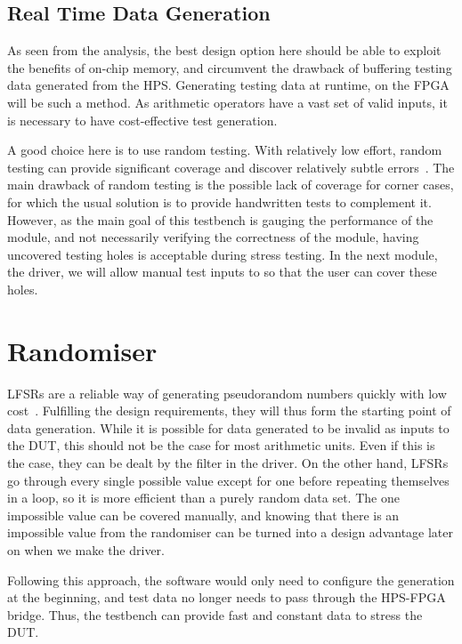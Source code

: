 \subsection{Real Time Data Generation}
As seen from the analysis, the best design option here should be able to exploit the benefits of on-chip memory, and circumvent the drawback of buffering testing data generated from the HPS.
Generating testing data at runtime, on the FPGA will be such a method.
As arithmetic operators have a vast set of valid inputs, it is necessary to have cost-effective test generation.

A good choice here is to use random testing.
With relatively low effort, random testing can provide significant coverage and discover relatively subtle errors~\cite{Duran1}.
The main drawback of random testing is the possible lack of coverage for corner cases, for which the usual solution is to provide handwritten tests to complement it.
However, as the main goal of this testbench is gauging the performance of the module, and not necessarily verifying the correctness of the module, having uncovered testing holes is acceptable during stress testing.
In the next module, the driver, we will allow manual test inputs to so that the user can cover these holes.

\section{Randomiser}

LFSRs are a reliable way of generating pseudorandom numbers quickly with low cost~\cite{Hazwani1}.
Fulfilling the design requirements, they will thus form the starting point of data generation.
While it is possible for data generated to be invalid as inputs to the DUT, this should not be the case for most arithmetic units.
Even if this is the case, they can be dealt by the filter in the driver.
On the other hand, LFSRs go through every single possible value except for one before repeating themselves in a loop, so it is more efficient than a purely random data set.
The one impossible value can be covered manually, and knowing that there is an impossible value from the randomiser can be turned into a design advantage later on when we make the driver.

Following this approach, the software would only need to configure the generation at the beginning, and test data no longer needs to pass through the HPS-FPGA bridge.
Thus, the testbench can provide fast and constant data to stress the DUT.

